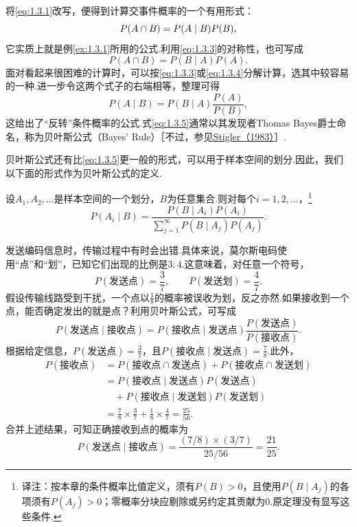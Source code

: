 将\eqref{eq:1.3.1}改写，便得到计算交事件概率的一个有用形式：
\begin{equation}\label{eq:1.3.3}\index{SI0123@乘法法则}P(A\cap B)=P(A\mid B)P(B),\end{equation}
它实质上就是例\ref{ex:1.3.1}所用的公式.利用\eqref{eq:1.3.3}的对称性，也可写成
\begin{equation}\label{eq:1.3.4}P(A\cap B)=P(B\mid A)P(A).\end{equation}
面对看起来很困难的计算时，可以按\eqref{eq:1.3.3}或\eqref{eq:1.3.4}分解计算，选其中较容易的一种.进一步令这两个式子的右端相等，整理可得
\begin{equation}\label{eq:1.3.5}P(A\mid B)=P(B\mid A)\frac{P(A)}{P(B)},\end{equation}
这给出了“反转”条件概率的公式.式\eqref{eq:1.3.5}通常以其发现者Thomas Bayes爵士命名，称为贝叶斯公式（Bayes' Rule）［不过，参见\hyperref[bib:source306]{Stigler（1983）}］.

贝叶斯公式还有比\eqref{eq:1.3.5}更一般的形式，可以用于样本空间的划分.因此，我们以下面的形式作为贝叶斯公式的定义.


\begin{theorem}[贝叶斯公式]\label{thm:1.3.5}
设$A_1,A_2,\ldots$是样本空间的一个划分，$B$为任意集合.则对每个$i=1,2,\ldots$，\footnote{译注：按本章的条件概率比值定义，须有$P(B)>0$，且使用$P(B\mid A_j)$的各项须有$P(A_j)>0$；零概率分块应剔除或另约定其贡献为0.原定理没有显写这些条件.}
$$P(A_i\mid B)=\frac{P(B\mid A_i)P(A_i)}{\sum_{j=1}^\infty P(B\mid A_j)P(A_j)}.$$
\end{theorem}

\begin{example}[编码]\label{ex:1.3.6}
发送编码信息时，传输过程中有时会出错.具体来说，莫尔斯电码使用“点”和“划”，已知它们出现的比例是$3:4$.这意味着，对任意一个符号，
$$P(\text{发送点})=\frac37,\qquad P(\text{发送划})=\frac47.$$
假设传输线路受到干扰，一个点以$\frac18$的概率被误收为划，反之亦然.如果接收到一个点，能否确定发出的就是点？利用贝叶斯公式，可写成
$$P(\text{发送点}\mid\text{接收点})=P(\text{接收点}\mid\text{发送点})\frac{P(\text{发送点})}{P(\text{接收点})}.$$
根据给定信息，$P(\text{发送点})=\frac37$，且$P(\text{接收点}\mid\text{发送点})=\frac78$.此外，
\begin{equation*}\begin{aligned}
P(\text{接收点})&=P(\text{接收点}\cap\text{发送点})+P(\text{接收点}\cap\text{发送划})\\
&=P(\text{接收点}\mid\text{发送点})P(\text{发送点})\\
&\quad+P(\text{接收点}\mid\text{发送划})P(\text{发送划})\\
&=\frac78\times\frac37+\frac18\times\frac47=\frac{25}{56}.
\end{aligned}\end{equation*}
合并上述结果，可知正确接收到点的概率为
$$P(\text{发送点}\mid\text{接收点})=\frac{(7/8)\times(3/7)}{25/56}=\frac{21}{25}.$$
\end{example}

